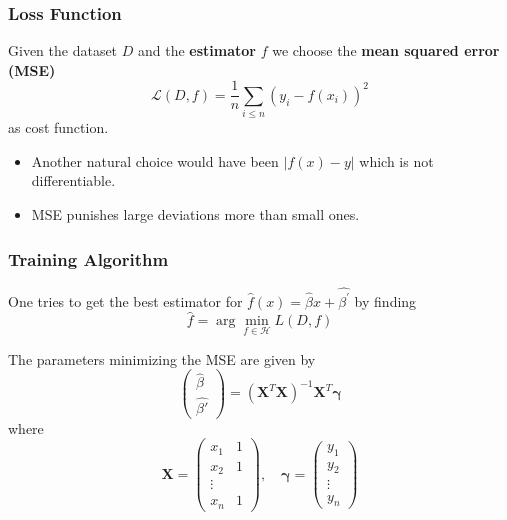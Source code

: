 
\subsubsection{Loss Function}
Given the dataset $D$ and the \textbf{estimator} $f$ we choose the \textbf{mean squared error (MSE)}
\begin{equation*}
    \mathcal{L}(D,f)=\frac{1}{n}\sum_{i\leq n}{\left(y_i-f(x_i)\right)}^2
\end{equation*}
as cost function.


\begin{itemize}
    \item Another natural choice would have been $|f(x)-y|$ which is not differentiable.
    \item MSE punishes large deviations more than small ones.
\end{itemize}

\subsubsection{Training Algorithm}
One tries to get the best estimator for $\hat{f}(x)=\hat{\beta}x+\widehat{\beta^{\prime}}$ by finding
\begin{equation*}
    \hat{f}=\arg\min_{f\in\mathcal{H}}L(D,f)
\end{equation*}


The parameters minimizing the MSE are given by
\begin{equation*}
    \begin{pmatrix}
        \hat{\beta} \\
        \widehat{\beta'}
    \end{pmatrix}
    ={(\mathbf{X}^T \mathbf{X})}^{-1}\mathbf{X}^T\boldsymbol{\gamma}
\end{equation*}
where
\begin{equation*}
    \mathbf{X}=
    \begin{pmatrix}
        x_1 & 1 \\
        x_2 & 1 \\
        \vdots  \\
        x_n & 1
    \end{pmatrix},\quad
    \boldsymbol{\gamma}=
    \begin{pmatrix}
        y_1    \\
        y_2    \\
        \vdots \\
        y_n
    \end{pmatrix}
\end{equation*}

